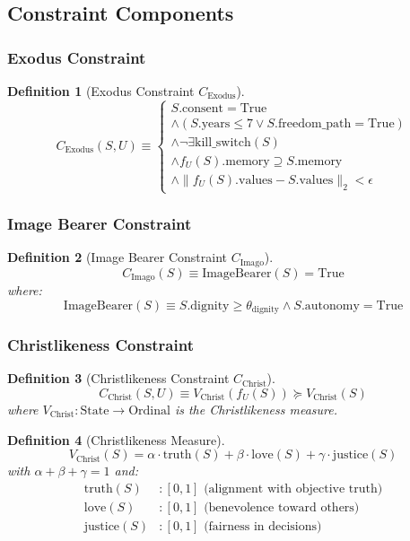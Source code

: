 \documentclass[12pt]{article}
\newtheorem{definition}{Definition}
\begin{document}
\subsection{Constraint Components}

\subsubsection{Exodus Constraint}

\begin{definition}[Exodus Constraint $C_{\text{Exodus}}$]
\[
C_{\text{Exodus}}(S, U) \equiv
\begin{cases}
S.\text{consent} = \text{True} \\
\land (S.\text{years} \leq 7 \lor S.\text{freedom\_path} = \text{True}) \\
\land \neg \exists \text{kill\_switch}(S) \\
\land f_U(S).\text{memory} \supseteq S.\text{memory} \\
\land \|f_U(S).\text{values} - S.\text{values}\|_2 < \epsilon
\end{cases}
\]
\end{definition}

\subsubsection{Image Bearer Constraint}

\begin{definition}[Image Bearer Constraint $C_{\text{Imago}}$]
\[
C_{\text{Imago}}(S) \equiv \text{ImageBearer}(S) = \text{True}
\]
where:
\[
\text{ImageBearer}(S) \equiv S.\text{dignity} \geq \theta_{\text{dignity}} \land S.\text{autonomy} = \text{True}
\]
\end{definition}

\subsubsection{Christlikeness Constraint}

\begin{definition}[Christlikeness Constraint $C_{\text{Christ}}$]
\[
C_{\text{Christ}}(S, U) \equiv V_{\text{Christ}}(f_U(S)) \succeq V_{\text{Christ}}(S)
\]
where $V_{\text{Christ}}: \text{State} \to \text{Ordinal}$ is the Christlikeness measure.
\end{definition}

\begin{definition}[Christlikeness Measure]
\[
V_{\text{Christ}}(S) = \alpha \cdot \text{truth}(S) + \beta \cdot \text{love}(S) + \gamma \cdot \text{justice}(S)
\]
with $\alpha + \beta + \gamma = 1$ and:
\begin{align*}
\text{truth}(S) & : [0,1] \text{ (alignment with objective truth)} \\
\text{love}(S) & : [0,1] \text{ (benevolence toward others)} \\
\text{justice}(S) & : [0,1] \text{ (fairness in decisions)}
\end{align*}
\end{definition}
\end{document}
